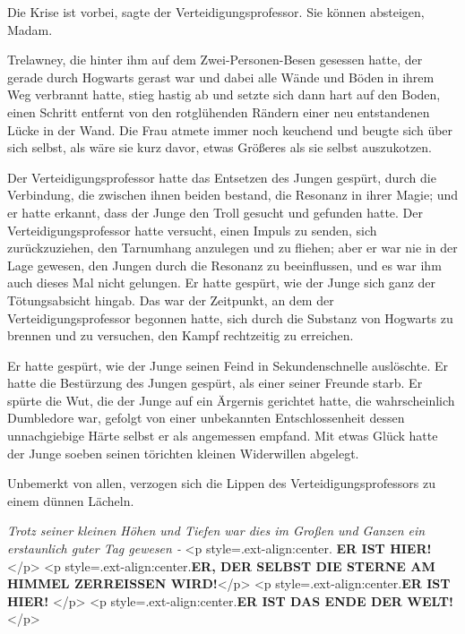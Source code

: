 \glqq Die Krise ist vorbei\grqq{}, sagte der Verteidigungsprofessor. \glqq Sie
können absteigen, Madam.\grqq{}

Trelawney, die hinter ihm auf dem Zwei-Personen-Besen gesessen hatte, der gerade
durch Hogwarts gerast war und dabei alle Wände und Böden in ihrem Weg verbrannt
hatte, stieg hastig ab und setzte sich dann hart auf den Boden, einen Schritt
entfernt von den rotglühenden Rändern einer neu entstandenen Lücke in der Wand.
Die Frau atmete immer noch keuchend und beugte sich über sich selbst, als wäre
sie kurz davor, etwas Größeres als sie selbst auszukotzen.

Der Verteidigungsprofessor hatte das Entsetzen des Jungen gespürt, durch die
Verbindung, die zwischen ihnen beiden bestand, die Resonanz in ihrer Magie; und
er hatte erkannt, dass der Junge den Troll gesucht und gefunden hatte. Der
Verteidigungsprofessor hatte versucht, einen Impuls zu senden, sich
zurückzuziehen, den Tarnumhang anzulegen und zu fliehen; aber er war nie in der
Lage gewesen, den Jungen durch die Resonanz zu beeinflussen, und es war ihm auch
dieses Mal nicht gelungen. Er hatte gespürt, wie der Junge sich ganz der
Tötungsabsicht hingab. Das war der Zeitpunkt, an dem der Verteidigungsprofessor
begonnen hatte, sich durch die Substanz von Hogwarts zu brennen und zu
versuchen, den Kampf rechtzeitig zu erreichen.

Er hatte gespürt, wie der Junge seinen Feind in Sekundenschnelle auslöschte. Er
hatte die Bestürzung des Jungen gespürt, als einer seiner Freunde starb. Er
spürte die Wut, die der Junge auf ein Ärgernis gerichtet hatte, die
wahrscheinlich Dumbledore war, gefolgt von einer unbekannten Entschlossenheit
dessen unnachgiebige Härte selbst er als angemessen empfand. Mit etwas Glück
hatte der Junge soeben seinen törichten kleinen Widerwillen abgelegt.

Unbemerkt von allen, verzogen sich die Lippen des Verteidigungsprofessors zu
einem dünnen Lächeln.

\emph{Trotz seiner kleinen Höhen und Tiefen war dies im Großen und Ganzen ein erstaunlich guter Tag gewesen -}
<p style=\grqq{}.ext-align:center\grqq{}.\textbf{ \glqq ER IST HIER!}</p> <p
style=\grqq{}.ext-align:center\grqq{}.\textbf{ER, DER SELBST DIE STERNE AM
HIMMEL ZERREISSEN WIRD!}</p> <p style=\grqq{}.ext-align:center\grqq{}.\textbf{ER
IST HIER! }</p> <p style=\grqq{}.ext-align:center\grqq{}.\textbf{ER IST DAS ENDE
DER WELT!\grqq{} } </p>

